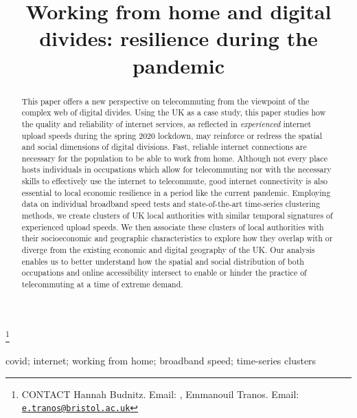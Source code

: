 \documentclass[]{interact}
\theoremstyle{plain}%
\theoremstyle{definition}
\theoremstyle{remark}
\begin{document}
\articletype{}

\title{Working from home and digital divides: resilience during the pandemic}


\author{
}

\thanks{CONTACT Hannah Budnitz. Email: , Emmanouil Tranos. Email: \href{mailto:e.tranos@bristol.ac.uk}{\nolinkurl{e.tranos@bristol.ac.uk}}}

\maketitle

\begin{abstract}
This paper offers a new perspective on telecommuting from the viewpoint
of the complex web of digital divides. Using the UK as a case study,
this paper studies how the quality and reliability of internet services,
as reflected in \emph{experienced} internet upload speeds during the
spring 2020 lockdown, may reinforce or redress the spatial and social
dimensions of digital divisions. Fast, reliable internet connections are
necessary for the population to be able to work from home. Although not
every place hosts individuals in occupations which allow for
telecommuting nor with the necessary skills to effectively use the
internet to telecommute, good internet connectivity is also essential to
local economic resilience in a period like the current pandemic.
Employing data on individual broadband speed tests and state-of-the-art
time-series clustering methods, we create clusters of UK local
authorities with similar temporal signatures of experienced upload
speeds. We then associate these clusters of local authorities with their
socioeconomic and geographic characteristics to explore how they overlap
with or diverge from the existing economic and digital geography of the
UK. Our analysis enables us to better understand how the spatial and
social distribution of both occupations and online accessibility
intersect to enable or hinder the practice of telecommuting at a time of
extreme demand.
\end{abstract}

\begin{keywords}
covid; internet; working from home; broadband speed; time-series
clusters
\end{keywords}
\end{document}
